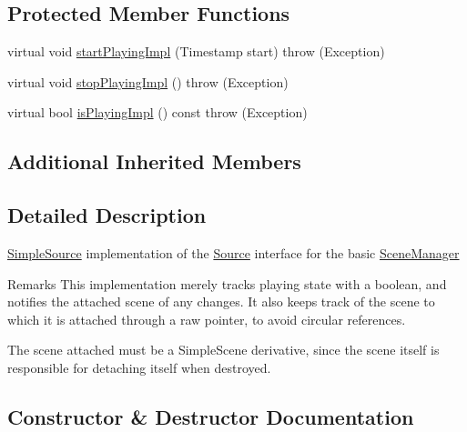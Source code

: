 \subsection*{Protected Member Functions}
\begin{DoxyCompactItemize}
\item 
virtual void \hyperlink{classAudio_1_1SimpleSource_a8aa133d72148aabedb8bdfa885e74b6b}{start\+Playing\+Impl} (Timestamp start)  throw (\+Exception)
\item 
virtual void \hyperlink{classAudio_1_1SimpleSource_a364dea7e215b115dee978f1d53e752fc}{stop\+Playing\+Impl} ()  throw (\+Exception)
\item 
virtual bool \hyperlink{classAudio_1_1SimpleSource_ae5971c20ed378c1886bf66d7b5d82699}{is\+Playing\+Impl} () const   throw (\+Exception)
\end{DoxyCompactItemize}
\subsection*{Additional Inherited Members}


\subsection{Detailed Description}
\hyperlink{classAudio_1_1SimpleSource}{Simple\+Source} implementation of the \hyperlink{classAudio_1_1Source}{Source} interface for the basic \hyperlink{classAudio_1_1SceneManager}{Scene\+Manager}

\begin{DoxyRemark}{Remarks}
This implementation merely tracks playing state with a boolean, and notifies the attached scene of any changes. It also keeps track of the scene to which it is attached through a raw pointer, to avoid circular references. 
\end{DoxyRemark}
\begin{DoxyParagraph}{The scene attached must be a Simple\+Scene derivative, since the scene itself is}
responsible for detaching itself when destroyed. 
\end{DoxyParagraph}


\subsection{Constructor \& Destructor Documentation}

